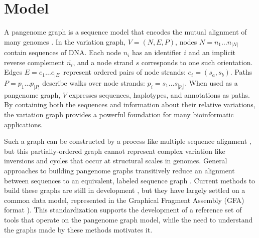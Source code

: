 \documentclass{bioinfo}
\begin{document}



\section{Model}

A pangenome graph is a sequence model that encodes the mutual alignment of many genomes \citep{Garrison_2019_thesis,Eizenga_2020}.
In the variation graph, $V = (N, E, P)$, nodes $N = n_1\ldots n_{|N|}$ contain sequences of DNA.
Each node $n_i$ has an identifier $i$ and an implicit reverse complement $\bar{n_i}$, and a node strand $s$ corresponds to one such orientation.
Edges $E = e_1\ldots e_{|E|}$ represent ordered pairs of node strands: $e_i = ( s_a, s_b )$.
Paths $P = p_1\ldots p_{|P|}$ describe walks over node strands: $p_i = s_1 \ldots s_{|p_i|}$.
When used as a pangenome graph, $V$ expresses sequences, haplotypes, and annotations as paths.
By containing both the sequences and information about their relative variations, the variation graph provides a powerful foundation for many bioinformatic applications.

Such a graph can be constructed by a process like multiple sequence alignment \citep{Lee_2002,Grasso_2004}, but this partially-ordered graph cannot represent complex variation like inversions and cycles that occur at structural scales in genomes.
General approaches to building pangenome graphs transitively reduce an alignment between sequences to an equivalent, labeled sequence graph \citep{Kehr_2014,Garrison_2019_thesis}.
Current methods to build these graphs are still in development \citep{Li:2020,Armstrong:2020,pggb}, but they have largely settled on a common data model, represented in the Graphical Fragment Assembly (GFA) format \citep{GFA}).
This standardization supports the development of a reference set of tools that operate on the pangenome graph model, while the need to understand the graphs made by these methods motivates it.
\end{document}
